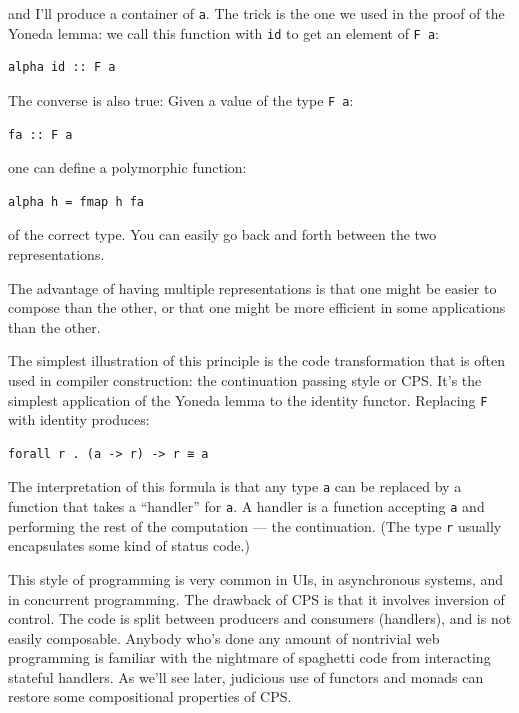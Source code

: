 and I'll produce a container of \texttt{a}. The trick is the one we used
in the proof of the Yoneda lemma: we call this function with \texttt{id}
to get an element of \texttt{F\ a}:

\begin{verbatim}
alpha id :: F a
\end{verbatim}

The converse is also true: Given a value of the type \texttt{F\ a}:

\begin{verbatim}
fa :: F a
\end{verbatim}

one can define a polymorphic function:

\begin{verbatim}
alpha h = fmap h fa
\end{verbatim}

of the correct type. You can easily go back and forth between the two
representations.

The advantage of having multiple representations is that one might be
easier to compose than the other, or that one might be more efficient in
some applications than the other.

The simplest illustration of this principle is the code transformation
that is often used in compiler construction: the continuation passing
style or CPS. It's the simplest application of the Yoneda lemma to the
identity functor. Replacing \texttt{F} with identity produces:

\begin{verbatim}
forall r . (a -> r) -> r ≅ a
\end{verbatim}

The interpretation of this formula is that any type \texttt{a} can be
replaced by a function that takes a ``handler'' for \texttt{a}. A
handler is a function accepting \texttt{a} and performing the rest of
the computation --- the continuation. (The type \texttt{r} usually
encapsulates some kind of status code.)

This style of programming is very common in UIs, in asynchronous
systems, and in concurrent programming. The drawback of CPS is that it
involves inversion of control. The code is split between producers and
consumers (handlers), and is not easily composable. Anybody who's done
any amount of nontrivial web programming is familiar with the nightmare
of spaghetti code from interacting stateful handlers. As we'll see
later, judicious use of functors and monads can restore some
compositional properties of CPS.

